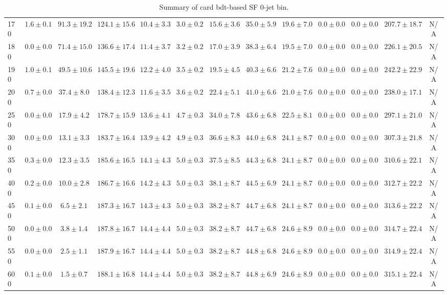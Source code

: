 \begin{table}
{\begin{center}
\begin{tabular}{l | c c | c c c c c c c c  | c c}
170 & $1.6\pm0.1$ & $91.3\pm19.2$ & $124.1\pm15.6$ & $10.4\pm3.3$ & $3.0\pm0.2$ & $15.6\pm3.6$ & $35.0\pm5.9$ & $19.6\pm7.0$ & $0.0\pm0.0$ & $0.0\pm0.0$ & $207.7\pm18.7$ & N/A \\
180 & $0.0\pm0.0$ & $71.4\pm15.0$ & $136.6\pm17.4$ & $11.4\pm3.7$ & $3.2\pm0.2$ & $17.0\pm3.9$ & $38.3\pm6.4$ & $19.5\pm7.0$ & $0.0\pm0.0$ & $0.0\pm0.0$ & $226.1\pm20.5$ & N/A \\
190 & $1.0\pm0.1$ & $49.5\pm10.6$ & $145.5\pm19.6$ & $12.2\pm4.0$ & $3.5\pm0.2$ & $19.5\pm4.5$ & $40.3\pm6.6$ & $21.2\pm7.6$ & $0.0\pm0.0$ & $0.0\pm0.0$ & $242.2\pm22.9$ & N/A \\
200 & $0.7\pm0.0$ & $37.4\pm8.0$ & $138.4\pm12.3$ & $11.6\pm3.5$ & $3.6\pm0.2$ & $22.4\pm5.1$ & $41.0\pm6.6$ & $21.0\pm7.6$ & $0.0\pm0.0$ & $0.0\pm0.0$ & $238.0\pm17.1$ & N/A \\
250 & $0.0\pm0.0$ & $17.9\pm4.2$ & $178.7\pm15.9$ & $13.6\pm4.1$ & $4.7\pm0.3$ & $34.0\pm7.8$ & $43.6\pm6.8$ & $22.5\pm8.1$ & $0.0\pm0.0$ & $0.0\pm0.0$ & $297.1\pm21.0$ & N/A \\
300 & $0.0\pm0.0$ & $13.1\pm3.3$ & $183.7\pm16.4$ & $13.9\pm4.2$ & $4.9\pm0.3$ & $36.6\pm8.3$ & $44.0\pm6.8$ & $24.1\pm8.7$ & $0.0\pm0.0$ & $0.0\pm0.0$ & $307.3\pm21.8$ & N/A \\
350 & $0.3\pm0.0$ & $12.3\pm3.5$ & $185.6\pm16.5$ & $14.1\pm4.3$ & $5.0\pm0.3$ & $37.5\pm8.5$ & $44.3\pm6.8$ & $24.1\pm8.7$ & $0.0\pm0.0$ & $0.0\pm0.0$ & $310.6\pm22.1$ & N/A \\
400 & $0.2\pm0.0$ & $10.0\pm2.8$ & $186.7\pm16.6$ & $14.2\pm4.3$ & $5.0\pm0.3$ & $38.1\pm8.7$ & $44.5\pm6.9$ & $24.1\pm8.7$ & $0.0\pm0.0$ & $0.0\pm0.0$ & $312.7\pm22.2$ & N/A \\
450 & $0.1\pm0.0$ & $6.5\pm2.1$ & $187.3\pm16.7$ & $14.3\pm4.3$ & $5.0\pm0.3$ & $38.2\pm8.7$ & $44.7\pm6.8$ & $24.1\pm8.7$ & $0.0\pm0.0$ & $0.0\pm0.0$ & $313.6\pm22.2$ & N/A \\
500 & $0.0\pm0.0$ & $3.8\pm1.4$ & $187.8\pm16.7$ & $14.4\pm4.4$ & $5.0\pm0.3$ & $38.2\pm8.7$ & $44.7\pm6.8$ & $24.6\pm8.9$ & $0.0\pm0.0$ & $0.0\pm0.0$ & $314.7\pm22.4$ & N/A \\
550 & $0.0\pm0.0$ & $2.5\pm1.1$ & $187.9\pm16.7$ & $14.4\pm4.4$ & $5.0\pm0.3$ & $38.2\pm8.7$ & $44.8\pm6.8$ & $24.6\pm8.9$ & $0.0\pm0.0$ & $0.0\pm0.0$ & $314.9\pm22.4$ & N/A \\
600 & $0.1\pm0.0$ & $1.5\pm0.7$ & $188.1\pm16.8$ & $14.4\pm4.4$ & $5.0\pm0.3$ & $38.2\pm8.7$ & $44.8\pm6.9$ & $24.6\pm8.9$ & $0.0\pm0.0$ & $0.0\pm0.0$ & $315.1\pm22.4$ & N/A \\
\hline
\end{tabular}
\end{center}
}
\caption{Summary of card bdt-based SF 0-jet bin.}
\end{table}
